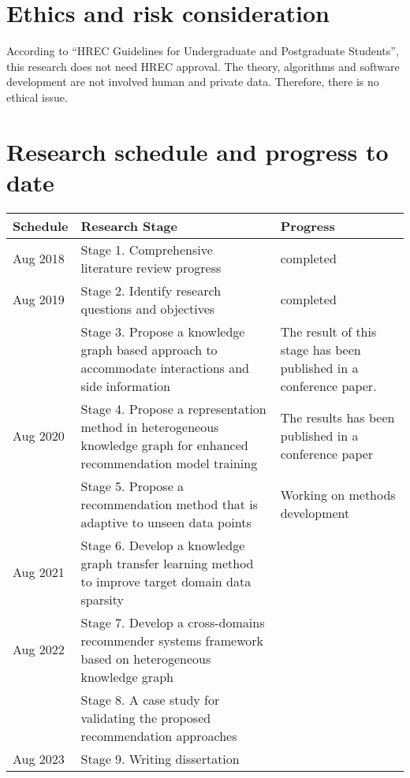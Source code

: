 \section{Ethics and risk consideration}
According to “HREC Guidelines for Undergraduate and Postgraduate Students”, this research does not need HREC approval.
The theory, algorithms and software development are not involved human and private data. Therefore, there is no ethical issue.

\section{Research schedule and progress to date}
 

\begin{table}[h!]
    \begin{tabular}{ |p{2cm}|p{6cm}|p{4cm}|}
     \hline
        Schedule & Research Stage & Progress \\
     \hline
        \rowcolor{gray}
        Aug 2018  & Stage 1. Comprehensive literature review progress  & completed  \\
        \hline
        \rowcolor{gray}
        Aug 2019  & Stage 2. Identify research questions and objectives  & completed  \\
        \rowcolor{gray}
        & Stage 3. Propose a knowledge graph based approach to accommodate interactions and side information & The result of this stage has been published in a conference paper. \\
        \hline
        \rowcolor{lightgray}
        Aug 2020  & Stage 4. Propose a representation method in heterogeneous knowledge graph for enhanced recommendation model training & The results has been published in a conference paper  \\
        \rowcolor{lightgray}
        & Stage 5. Propose a recommendation method that is adaptive to unseen data points  & Working on methods development \\
        \hline
        Aug 2021  & Stage 6. Develop a knowledge graph transfer learning method to improve target domain data sparsity & \\
        \hline
        Aug 2022  & Stage 7. Develop a cross-domains recommender systems framework based on heterogeneous knowledge graph  & \\
        & Stage 8.  A case study for validating the proposed recommendation approaches  & \\
        \hline
        Aug 2023 & Stage 9. Writing dissertation & \\
      \hline
     \end{tabular}
\end{table}

